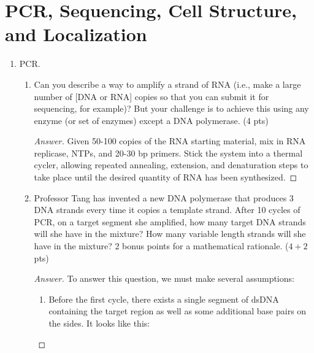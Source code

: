 \documentclass[../psets.tex]{subfiles}
\begin{document}
\section{PCR, Sequencing, Cell Structure, and Localization}
\begin{enumerate}
    \item {}PCR.
    \begin{enumerate}
        \item Can you describe a way to amplify a strand of RNA (i.e., make a large number of [DNA or RNA] copies so that you can submit it for sequencing, for example)? But your challenge is to achieve this using any enzyme (or set of enzymes) except a DNA polymerase. (4 pts)
        \begin{proof}[Answer]
            Given 50-100 copies of the RNA starting material, mix in RNA replicase, NTPs, and 20-30 bp primers. Stick the system into a thermal cycler, allowing repeated annealing, extension, and denaturation steps to take place until the desired quantity of RNA has been synthesized.
        \end{proof}
        \item Professor Tang has invented a new DNA polymerase that produces 3 DNA strands every time it copies a template strand. After 10 cycles of PCR, on a target segment she amplified, how many target DNA strands will she have in the mixture? How many variable length strands will she have in the mixture? 2 bonus points for a mathematical rationale. ($4+2$ pts)
        \begin{proof}[Answer]
            To answer this question, we must make several assumptions:
            \begin{enumerate}
                \item Before the first cycle, there exists a single segment of dsDNA containing the target region as well as some additional base pairs on the sides. It looks like this:
                \begin{figure}[h!]
                    \centering
\end{figure}
\end{enumerate}
\end{proof}
\end{enumerate}
\end{enumerate}
\end{document}
